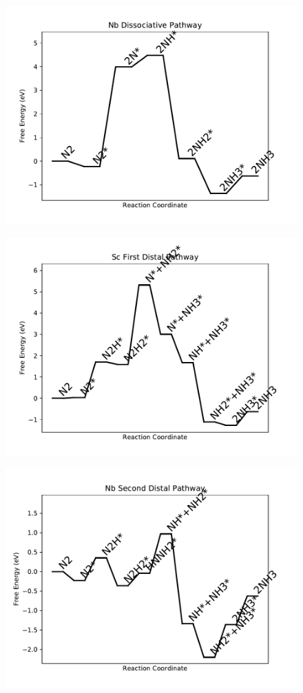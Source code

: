 \begin{figure}
\includegraphics[width=0.8\linewidth]{data/plots/Nb_dissociative.pdf}
\end{figure}

\begin{figure}
\includegraphics[width=0.8\linewidth]{data/plots/Sc_distal_1.pdf}
\end{figure}

\begin{figure}
\includegraphics[width=0.8\linewidth]{data/plots/Nb_distal_2.pdf}
\end{figure}

